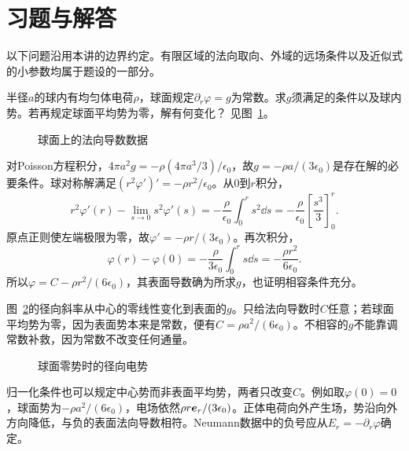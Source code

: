

\section{习题与解答}
以下问题沿用本讲的边界约定。有限区域的法向取向、外域的远场条件以及近似式的小参数均属于题设的一部分。

\begin{exercise}[Neumann数据的相容性]\label{ex:es2-h1}
半径$a$的球内有均匀体电荷$\rho$，球面规定$\partial_r\varphi=g$为常数。求$g$须满足的条件以及球内势。若再规定球面平均势为零，解有何变化？ 见图~\ref{fig:es2-h1-q}。
\end{exercise}

\begin{figure}[H]\centering
{}
\caption{球面上的法向导数数据}\label{fig:es2-h1-q}
\end{figure}
\begin{solution}
对Poisson方程积分，$4\pi a^2g=-\rho(4\pi a^3/3)/\epsilon_0$，故$g=-\rho a/(3\epsilon_0)$是存在解的必要条件。球对称解满足$(r^2\varphi')'=-\rho r^2/\epsilon_0$。从$0$到$r$积分，
\[r^2\varphi'(r)-\lim_{s\to0}s^2\varphi'(s)
=-\frac\rho{\epsilon_0}\int_0^rs^2\dd s
=-\frac\rho{\epsilon_0}\left[\frac{s^3}3\right]_0^r.\]
原点正则使左端极限为零，故$\varphi'=-\rho r/(3\epsilon_0)$。再次积分，
\[\varphi(r)-\varphi(0)=-\frac\rho{3\epsilon_0}\int_0^rs\dd s
=-\frac{\rho r^2}{6\epsilon_0}.\]
所以$\varphi=C-\rho r^2/(6\epsilon_0)$，其表面导数确为所求$g$，也证明相容条件充分。

图~\ref{fig:es2-h1-s}的径向斜率从中心的零线性变化到表面的$g$。只给法向导数时$C$任意；若球面平均势为零，因为表面势本来是常数，便有$C=\rho a^2/(6\epsilon_0)$。不相容的$g$不能靠调常数补救，因为常数不改变任何通量。
\begin{figure}[H]\centering
{}
\caption{球面零势时的径向电势}\label{fig:es2-h1-s}
\end{figure}


归一化条件也可以规定中心势而非表面平均势，两者只改变$C$。例如取$\varphi(0)=0$，球面势为$-\rho a^2/(6\epsilon_0)$，电场依然$\rho r\bm{e}_r/(3\epsilon_0)$。正体电荷向外产生场，势沿向外方向降低，与负的表面法向导数相符。Neumann数据中的负号应从$E_r=-\partial_r\varphi$确定。
\end{solution}

